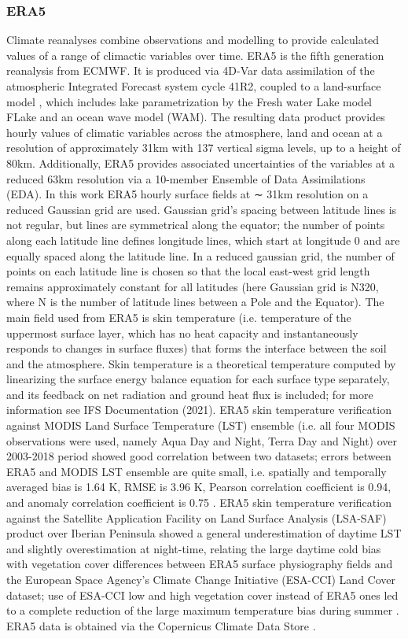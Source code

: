 \documentclass[hess, twostagejnl]{copernicus}
\begin{document}
\subsubsection{ERA5}
\noindent Climate reanalyses combine observations and modelling to provide calculated values of a range of climactic variables over time. ERA5 is the fifth generation reanalysis from ECMWF. It is produced via 4D-Var data assimilation of the atmospheric Integrated Forecast system cycle 41R2, coupled to a land-surface model \citep[ECLand,][]{Boussetta2021}, which includes lake parametrization by the Fresh water Lake model FLake \citep{Mironov2008} and an ocean wave model (WAM). The resulting data product provides hourly values of climatic variables across the atmosphere, land and ocean at a resolution of approximately 31km with 137 vertical sigma levels, up to a height of 80km. Additionally, ERA5 provides associated uncertainties of the variables at a reduced 63km resolution via a 10-member Ensemble of Data Assimilations (EDA). In this work ERA5 hourly surface fields at ∼ 31km resolution on a reduced Gaussian grid are used. Gaussian grid’s spacing between latitude lines is not regular, but lines are symmetrical along the equator; the number of points along each latitude line defines longitude lines, which start at longitude 0 and are equally spaced along the latitude line. In a reduced gaussian grid, the number of points on each latitude line is chosen so that the local east-west grid length remains approximately constant for all latitudes (here Gaussian grid is N320, where N is the number of latitude lines between a Pole and the Equator). The main field used from ERA5 is skin temperature (i.e. temperature of the uppermost surface layer, which has no heat capacity and instantaneously responds to changes in surface fluxes) that forms the interface between the soil and the atmosphere. Skin temperature is a theoretical temperature computed by linearizing the surface energy balance equation for each surface type separately, and its feedback on net radiation and ground heat flux is included; for more information see IFS Documentation (2021). ERA5 skin temperature verification against MODIS Land Surface Temperature (LST) ensemble (i.e. all four MODIS observations were used, namely Aqua Day and Night, Terra Day and Night) over 2003-2018 period showed good correlation between two datasets; errors between ERA5 and MODIS LST ensemble are quite small, i.e. spatially and temporally averaged bias is 1.64 K, RMSE is 3.96 K, Pearson correlation coefficient is 0.94, and anomaly correlation coefficient is 0.75 \citep{essd-13-4349-2021}. ERA5 skin temperature verification against the Satellite Application Facility on Land Surface Analysis (LSA-SAF) product over Iberian Peninsula showed a general underestimation of daytime LST and slightly overestimation at night-time, relating the large daytime cold bias with vegetation cover differences between ERA5 surface physiography fields and the European Space Agency’s Climate Change Initiative (ESA-CCI) Land Cover dataset; use of ESA-CCI low and high vegetation cover instead of ERA5 ones led to a complete reduction of the large maximum temperature bias during summer \citep{Johannsen2019}. ERA5 data is obtained via the Copernicus Climate Data Store \citep[CDS,][]{CDS}.
\end{document}
